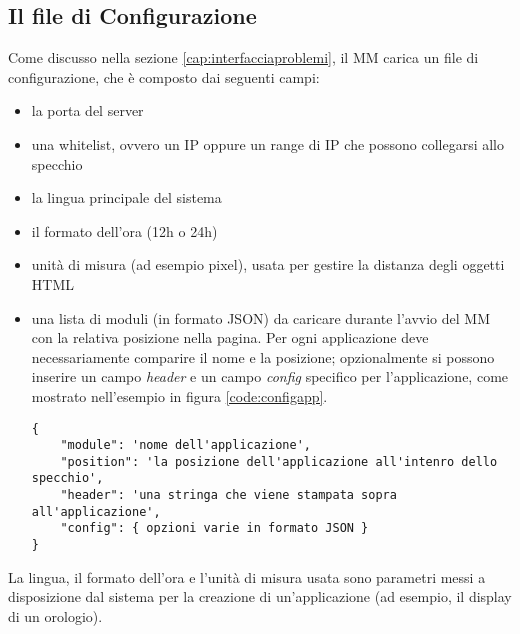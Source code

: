 \subsection{Il file di Configurazione}\label{cap:MMconf}
Come discusso nella sezione \ref{cap:interfacciaproblemi}, il MM carica un file di configurazione, che \`e composto dai seguenti campi:
\begin{itemize}
\item la porta del server
\item una whitelist, ovvero un IP oppure un range di IP che possono collegarsi allo specchio
\item la lingua principale del sistema
\item il formato dell'ora (12h o 24h)
\item unit\`a di misura (ad esempio pixel), usata per gestire la distanza degli oggetti HTML
\item una lista di moduli (in formato JSON) da caricare durante l'avvio del MM con la relativa posizione nella pagina. Per ogni applicazione deve necessariamente comparire il
nome e la posizione; opzionalmente si possono inserire un campo  \textit{header} e un campo \textit{config} specifico per l'applicazione, come mostrato
nell'esempio in figura \ref{code:configapp}.
\begin{lstlisting}[label={code:configapp}, caption={Campi di configurazione di un modulo nel MM}, captionpos=b]
{
	"module": 'nome dell'applicazione',
	"position": 'la posizione dell'applicazione all'intenro dello specchio',
	"header": 'una stringa che viene stampata sopra all'applicazione',
	"config": { opzioni varie in formato JSON }
}
\end{lstlisting}
\end{itemize}
La lingua, il formato dell'ora e l'unit\`a di misura usata sono parametri messi a disposizione dal sistema per la creazione di un'applicazione
(ad esempio, il display di un orologio).

